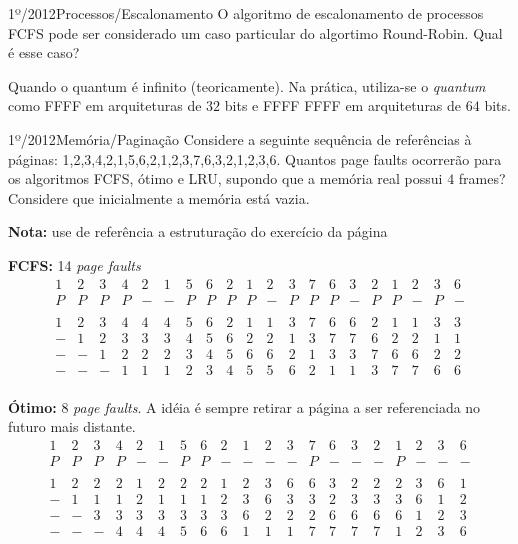 \begin{exercicio}
  {1º/2012}{Processos/Escalonamento}
  {O algoritmo de escalonamento de processos FCFS pode ser considerado um caso particular do algortimo Round-Robin. Qual é esse caso?}

  Quando o quantum é infinito (teoricamente). Na prática, utiliza-se o \textit{quantum} como FFFF em arquiteturas de $32$ bits e FFFF FFFF em arquiteturas de $64$ bits.
\end{exercicio}

\begin{exercicio}
  {1º/2012}{Memória/Paginação}
  {Considere a seguinte sequência de referências à páginas:
  1,2,3,4,2,1,5,6,2,1,2,3,7,6,3,2,1,2,3,6. \newline
  Quantos page faults ocorrerão para os algoritmos FCFS, ótimo e LRU, supondo que a memória real possui $4$ frames? Considere que inicialmente a memória está vazia.}

  \textbf{Nota:} use de referência a estruturação do exercício da página \pageref{ex:pagination-1}

  \textbf{FCFS:} 14 \textit{page faults} \\
  \[
  \begin{array}{cccccccccccccccccccc}
1 & 2 & 3 & 4 & 2 & 1 & 5 & 6 & 2 & 1 & 2 & 3 & 7 & 6 & 3 & 2 & 1 & 2 & 3 & 6 \\ \hline
P & P & P & P & - & - & P & P & P & P & - & P & P & P & - & P & P & - & P & - \\
\\
1 & 2 & 3 & 4 & 4 & 4 & 5 & 6 & 2 & 1 & 1 & 3 & 7 & 6 & 6 & 2 & 1 & 1 & 3 & 3 \\
- & 1 & 2 & 3 & 3 & 3 & 4 & 5 & 6 & 2 & 2 & 1 & 3 & 7 & 7 & 6 & 2 & 2 & 1 & 1 \\
- & - & 1 & 2 & 2 & 2 & 3 & 4 & 5 & 6 & 6 & 2 & 1 & 3 & 3 & 7 & 6 & 6 & 2 & 2 \\
- & - & - & 1 & 1 & 1 & 2 & 3 & 4 & 5 & 5 & 6 & 2 & 1 & 1 & 3 & 7 & 7 & 6 & 6 \\
  \end{array}
  \]

  \textbf{Ótimo:} 8 \textit{page faults}. A idéia é sempre retirar a página a ser referenciada no futuro mais distante. \\
  \[
  \begin{array}{cccccccccccccccccccc}
1 & 2 & 3 & 4 & 2 & 1 & 5 & 6 & 2 & 1 & 2 & 3 & 7 & 6 & 3 & 2 & 1 & 2 & 3 & 6 \\ \hline
P & P & P & P & - & - & P & P & - & - & - & - & P & - & - & - & P & - & - & - \\
\\
1 & 2 & 2 & 2 & 1 & 2 & 2 & 2 & 1 & 2 & 3 & 6 & 6 & 3 & 2 & 2 & 2 & 3 & 6 & 1 \\
- & 1 & 1 & 1 & 2 & 1 & 1 & 1 & 2 & 3 & 6 & 3 & 3 & 2 & 3 & 3 & 3 & 6 & 1 & 2 \\
- & - & 3 & 3 & 3 & 3 & 3 & 3 & 3 & 6 & 2 & 2 & 2 & 6 & 6 & 6 & 6 & 1 & 2 & 3 \\
- & - & - & 4 & 4 & 4 & 5 & 6 & 6 & 1 & 1 & 1 & 7 & 7 & 7 & 7 & 1 & 2 & 3 & 6 \\
  \end{array}
  \]


\end{exercicio}
